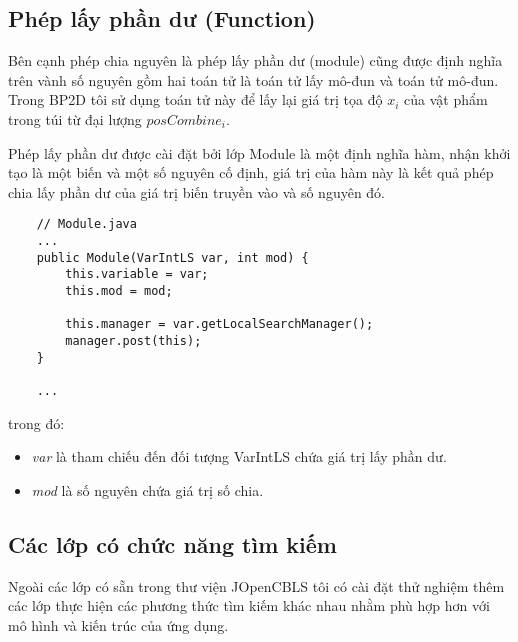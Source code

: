 \subsection{Phép lấy phần dư (Function)}
Bên cạnh phép chia nguyên là phép lấy phần dư (module) cũng được định nghĩa trên vành số nguyên gồm hai toán tử là toán tử lấy mô-đun và toán tử mô-đun. Trong BP2D tôi sử dụng toán tử này để lấy lại giá trị tọa độ $x_i$ của vật phẩm trong túi từ đại lượng $posCombine_i$.

Phép lấy phần dư được cài đặt bởi lớp \textsf{Module} là một định nghĩa hàm, nhận khởi tạo là một biến và một số nguyên cố định, giá trị của hàm này là kết quả phép chia lấy phần dư của giá trị biến truyền vào và số nguyên đó.

\begin{lstlisting}
	// Module.java
	...
	public Module(VarIntLS var, int mod) {
		this.variable = var;
		this.mod = mod;
		
		this.manager = var.getLocalSearchManager();
		manager.post(this);
	}
	
	...
\end{lstlisting}
trong đó:
\begin{itemize}
	\item \textit{var} là tham chiếu đến đối tượng \textsf{VarIntLS} chứa giá trị lấy phần dư.
	\item \textit{mod} là số nguyên chứa giá trị số chia.
\end{itemize}
\subsection{Các lớp có chức năng tìm kiếm}
Ngoài các lớp có sẵn trong thư viện JOpenCBLS tôi có cài đặt thử nghiệm thêm các lớp thực hiện các phương thức tìm kiếm khác nhau nhằm phù hợp hơn với mô hình và kiến trúc của ứng dụng.
